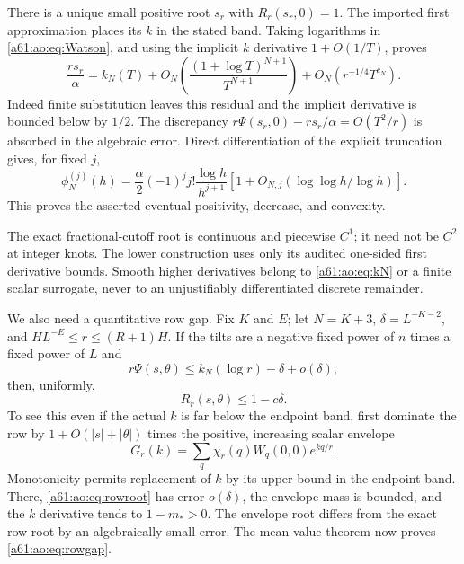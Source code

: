 \documentclass[11pt,letterpaper]{article}
\numberwithin{equation}{section}
\theoremstyle{remark}\newtheorem{remark}[theorem]{Remark}
\begin{document}
There is a unique small positive root $s_r$ with $R_r(s_r,0)=1$.
The imported first approximation places its $k$ in the stated band.
Taking logarithms in \eqref{a61:ao:eq:Watson}, and using the implicit
$k$ derivative $1+O(1/T)$, proves
\begin{equation}\label{a61:ao:eq:rowroot}
 \frac{rs_r}{\alpha}=k_N(T)
 +O_N\left(\frac{(1+\log T)^{N+1}}{T^{N+1}}\right)
 +O_N(r^{-1/4}T^{c_N}).
\end{equation}
Indeed finite substitution leaves this residual and the implicit
derivative is bounded below by $1/2$. The discrepancy
$r\Psi(s_r,0)-rs_r/\alpha=O(T^2/r)$ is absorbed in the algebraic
error. Direct differentiation of the explicit truncation gives, for
fixed $j$,
\begin{equation}\label{a61:ao:eq:potentialderivative}
 \phi_N^{(j)}(h)=\frac\alpha2(-1)^j j!\frac{\log h}{h^{j+1}}
 [1+O_{N,j}(\log\log h/\log h)].
\end{equation}
This proves the asserted eventual positivity, decrease, and convexity.

The exact fractional-cutoff root is continuous and piecewise $C^1$;
it need not be $C^2$ at integer knots. The lower construction uses
only its audited one-sided first derivative bounds. Smooth higher
derivatives belong to \eqref{a61:ao:eq:kN} or a finite scalar surrogate,
never to an unjustifiably differentiated discrete remainder.

We also need a quantitative row gap. Fix $K$ and $E$; let
$N=K+3$, $\delta=L^{-K-2}$, and
$HL^{-E}\le r\le(R+1)H$. If the tilts are a negative fixed power of
$n$ times a fixed power of $L$ and
\[
 r\Psi(s,\theta)\le k_N(\log r)-\delta+o(\delta),
\]
then, uniformly,
\begin{equation}\label{a61:ao:eq:rowgap}
 R_r(s,\theta)\le1-c\delta.
\end{equation}
To see this even if the actual $k$ is far below the endpoint band,
first dominate the row by $1+O(|s|+|\theta|)$ times the positive,
increasing scalar envelope
\[
 G_r(k)=\sum_q\chi_r(q)W_q(0,0)e^{kq/r}.
\]
Monotonicity permits replacement of $k$ by its upper bound in the
endpoint band. There, \eqref{a61:ao:eq:rowroot} has error $o(\delta)$, the
envelope mass is bounded, and the $k$ derivative tends to
$1-m_*>0$. The envelope root differs from the exact row root by an
algebraically small error. The mean-value theorem now proves
\eqref{a61:ao:eq:rowgap}.
\end{document}
